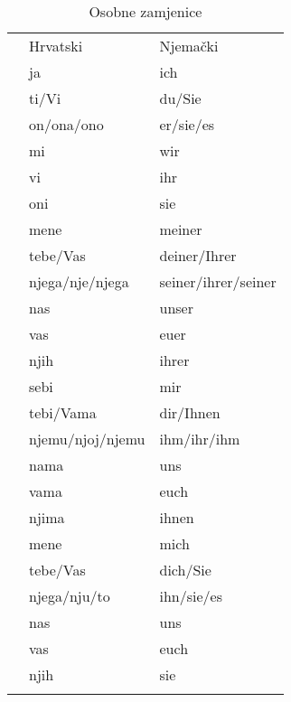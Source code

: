 \documentclass[12pt,german]{article}
\newenvironment{zamjenicetbl}[1]
{%
  \begin{table}[H]
    \caption{#1 zamjenice}
    \begin{tabular}{lll}
    \toprule
      & Hrvatski  &  Njemački \\
}{%
      \bottomrule
    \end{tabular}
  \end{table}}
\begin{document}
\begin{multicols}{2}
\begin{zamjenicetbl}{Osobne}
  \zamjenicepadez{Nominativ}
    & ja         & ich \\
    & ti/Vi      & du/Sie \\
    & on/ona/ono & er/sie/es \\
    & mi         & wir \\
    & vi         & ihr \\
    & oni        & sie \\
  \endzamjenicepadez
  \zamjenicepadez{Genitiv}
    & mene         & meiner \\
    & tebe/Vas     & deiner/Ihrer \\
    & njega/nje/njega & seiner/ihrer/seiner \\
    & nas          & unser \\
    & vas          & euer \\
    & njih         & ihrer \\
  \endzamjenicepadez
  \zamjenicepadez{Dativ}
    & sebi               & mir \\
    & tebi/Vama          & dir/Ihnen \\
    & njemu/njoj/njemu   & ihm/ihr/ihm \\
    & nama               & uns \\
    & vama               & euch \\
    & njima              & ihnen \\
  \endzamjenicepadez
  \zamjenicepadez{Akuzativ}
    & mene         & mich       \\
    & tebe/Vas     & dich/Sie   \\
    & njega/nju/to & ihn/sie/es \\
    & nas          & uns        \\
    & vas          & euch       \\
    & njih         & sie        \\
  \endzamjenicepadez
\end{zamjenicetbl}


\end{multicols}
\end{document}
